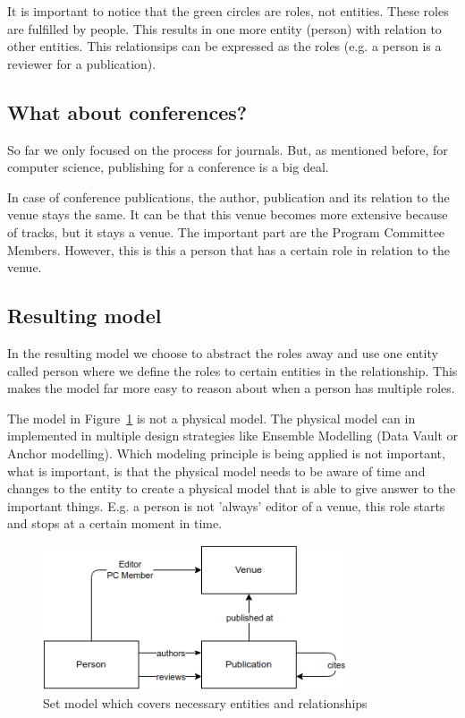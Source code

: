 \documentclass{ou-report}
\begin{document}
It is important to notice that the green circles are roles, not entities. These 
roles are fulfilled by people. This results in one more entity (person) with 
relation to other entities. This relationsips can be expressed as the roles 
(e.g. a person is a reviewer for a publication).

\subsection{What about conferences?}
So far we only focused on the process for journals. But, as mentioned before, 
for computer science, publishing for a conference is a big deal.

In case of conference publications, the author, publication and its relation to 
the venue stays the same. It can be that this venue becomes more extensive 
because of tracks, but it stays a venue.
The important part are the Program Committee Members. However, this is this a 
person that has a certain role in relation to the venue.

\subsection{Resulting model}
In the resulting model we choose to abstract the roles away and use one entity 
called person where we define the roles to certain entities in the relationship. 
This makes the model far more easy to reason about when a person has multiple 
roles.

The model in Figure~\ref{fig:resulting_model} is not a physical model. The 
physical model can in implemented in multiple design strategies like Ensemble 
Modelling (Data Vault or Anchor modelling). Which modeling principle is being 
applied is not important, what is important, is that the physical model needs to 
be aware of time and changes to the entity to create a physical model that is 
able to give answer to the important things. E.g. a person is not 'always' 
editor of a venue, this role starts and stops at a certain moment in time.
\begin{figure}[H]
\centering
\includegraphics[width=9cm]{images/set_model.png}
\caption{Set model which covers necessary entities and relationships}
\label{fig:resulting_model}
\end{figure}
\end{document}
